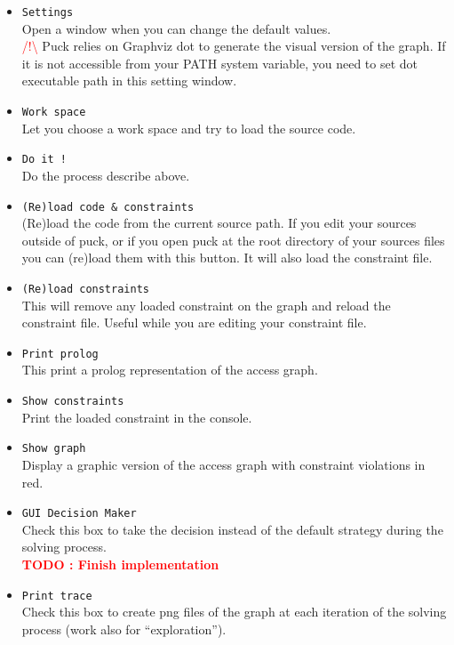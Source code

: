 \documentclass[]{article}
\newcommand{\todo}[1]{\textcolor{red}{\textbf{TODO : #1}}}
\newcommand{\important}[1]{\textcolor{red}{/!\textbackslash} #1}
\begin{document}
\begin{itemize}
	\item \verb|Settings|\\
	Open a window when you can change the default values.\\
	\important{Puck relies on Graphviz dot\cite{graphviz} to generate the visual version of the graph. If it is not accessible from your PATH system variable, you need to set dot executable path in this setting window.}
	
	\item \verb|Work space|\\
	Let you choose a work space and try to load the source code.
	
	\item \verb|Do it !|\\
	Do the process describe above.
	
	\item \verb|(Re)load code & constraints|\\
	(Re)load the code from the current source path. If you edit your sources outside of puck, or if you open puck at the root directory of your sources files you can (re)load them with this button. It will also load the constraint file.
	
	\item \verb|(Re)load constraints|\\
	This will remove any loaded constraint on the graph and reload the constraint file. Useful while you are editing your constraint file.
	
	\item \verb|Print prolog|\\
	This print a prolog representation of the access graph.
	
	\item \verb|Show constraints|\\
	Print the loaded constraint in the console.
	
	\item \verb|Show graph|\\
	Display a graphic version of the access graph with constraint violations in red.
	
	\item \verb|GUI Decision Maker|\\
	Check this box to take the decision instead of the default strategy during the solving process.\\
	\todo{Finish implementation}
	
	\item \verb|Print trace|\\
	Check this box to create png files of the graph at each iteration of the solving process (work also for ``exploration'').
	

\end{itemize}
\end{document}
